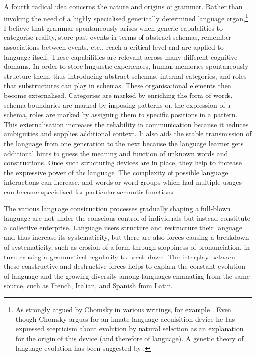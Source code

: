 A fourth radical idea concerns the nature and origins of 
grammar. Rather than invoking the need of a highly 
specialised genetically determined language 
organ,\footnote{As strongly argued by Chomsky in various writings, for example \cite{Chomsky:1968}. Even though Chomsky argues for 
an innate language acquisition device he has expressed
scepticism about evolution by natural selection
as an explanation for the 
origin of this device (and therefore of language). 
A genetic theory of language evolution 
has been suggested by \cite{Pinker:1994}.} 
I believe that grammar spontaneously arises when 
generic capabilities to categorise reality, store past
events in terms of abstract schemas, remember associations
between events, etc., reach a critical level and are
applied to language itself. These capabilities are 
relevant across many different cognitive domains. 
In order to store linguistic
experiences, human memories spontaneously structure them, thus 
introducing abstract schemas, internal categories, and 
roles that substructures can play in schemas.
These organisational elements then become externalised. 
Categories are marked by enriching
the form of words, schema boundaries are marked by 
imposing patterns on the expression of a schema, 
roles are marked by assigning
them to specific positions in a 
pattern. This externalisation 
increases the reliability in communication because
it reduces ambiguities and supplies additional context. It 
also aids the stable transmission of the language from one
generation to the next because the language learner
gets additional hints to guess the meaning and function of unknown
words and constructions. 
Once such structuring devices are in place, they help 
to increase the expressive power of the language. The 
complexity of possible language interactions can increase, 
and words or word groups which had multiple usages
can become specialised for particular semantic functions. 

The various language construction processes gradually 
shaping a full-blown language 
are not under the conscious control of individuals but
instead constitute a collective enterprise. Language users 
structure and restructure their language and thus increase its
systematicity, but there are also forces causing a breakdown 
of systematicity, such as erosion of a form 
through sloppiness of pronunciation, in turn causing a grammatical 
regularity to break down. The interplay between 
these constructive and destructive forces helps to explain
the constant evolution of language and the growing 
diversity among languages emanating from the same source, such as
French, Italian, and Spanish from Latin. 

